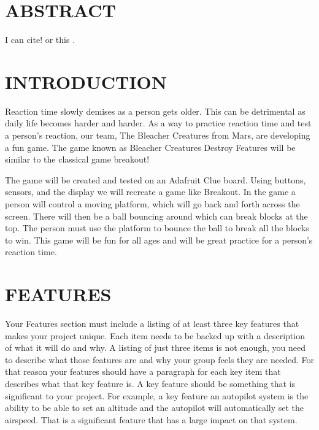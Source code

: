 \documentclass[12pt]{article}
\begin{document}
\tableofcontents
\pagebreak

\section{ABSTRACT}

I can cite! \cite{einstein} or this \cite{dirac}.

\section{INTRODUCTION}
Reaction time slowly demises as a person gets older. This can be detrimental as daily life becomes harder and harder. As a way to practice reaction time and test a person's reaction, our team, The Bleacher Creatures from Mars, are developing a fun game. The game known as Bleacher Creatures Destroy Features will be similar to the classical game breakout!

The game will be created and tested on an Adafruit Clue board. Using buttons, sensors, and the display we will recreate a game like Breakout. In the game a person will control a moving platform, which will go back and forth across the screen. There will then be a ball bouncing around which can break blocks at the top. The person must use the platform to bounce the ball to break all the blocks to win. This game will be fun for all ages and will be great practice for a person's reaction time.


\section{FEATURES}
Your Features section must include a listing of at least three key features that makes your project unique. Each item needs to be backed up with a description of what it will do and why. A listing of just three items is not enough, you need to describe what those features are and why your group feels they are needed. For that reason your features should have a paragraph for each key item that describes what that key feature is. A key feature should be something that is significant to your project. For example, a key feature an autopilot system is the ability to be able to set an altitude and the autopilot will automatically set the airspeed. That is a significant feature that has a large impact on that system.
\end{document}
